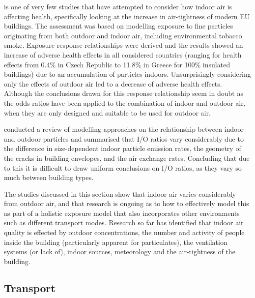 \cite{Gens2014} is one of very few studies that have attempted to consider how indoor air is affecting health, specifically looking at the increase in air-tightness of modern EU buildings. The assessment was based on modelling exposure to fine particles originating from both outdoor and indoor air, including environmental tobacco smoke. Exposure response relationships were derived and the results showed an increase of adverse health effects in all considered countries (ranging for health effects from 0.4\% in Czech Republic to 11.8\% in Greece for 100\% insulated buildings) due to an accumulation of particles indoors. Unsurprisingly considering only the effects of outdoor air led to a decrease of adverse health effects.  Although the conclusions drawn for this response relationship seem in doubt as the odds-ratios have been applied to the combination of indoor and outdoor air, when they are only designed and suitable to be used for outdoor air.

\cite{Chen2011} conducted a review of modelling approaches on the relationship between indoor and outdoor particles and summarised that I/O ratios vary considerably due to the difference in size-dependent indoor particle emission rates, the geometry of the cracks in building envelopes, and the air exchange rates. Concluding that due to this it is difficult to draw uniform conclusions on I/O ratios, as they vary so much between building types.

The studies discussed in this section show that indoor air varies considerably from outdoor air, and that research is ongoing as to how to effectively model this as part of a holistic exposure model that also incorporates other environments such as different transport modes. Research so far has identified that indoor air quality is effected by outdoor concentrations, the number and activity of people inside the building (particularly apparent for particulates), the ventilation systems (or lack of), indoor sources, meteorology and the air-tightness of the building.



\subsection{Transport}
\label{sec:transport}

